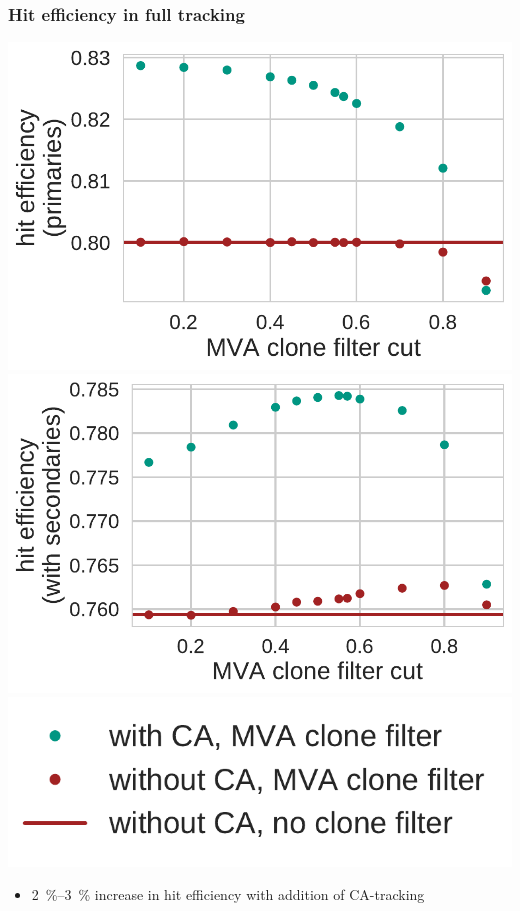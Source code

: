 \documentclass[18pt, aspectratio=169]{beamer}
\begin{document}
\begin{frame}
  \frametitle{Hit efficiency in full tracking}
  \begin{center}
    \includegraphics[width=.4\textwidth]{figures/ca_hit_efficiency_primaries_fullreco.pdf}
    \includegraphics[width=.4\textwidth]{figures/ca_hit_efficiency_with_secondaries_fullreco.pdf}\\
    \includegraphics[width=.3\textwidth]{figures/legend_ca_fom_fullreco.pdf}
  \end{center}
  \begin{itemize}
  \item \SI{2}{\percent}--\SI{3}{\percent} increase in hit efficiency with addition of CA-tracking
  \end{itemize}
\end{frame}
\end{document}
